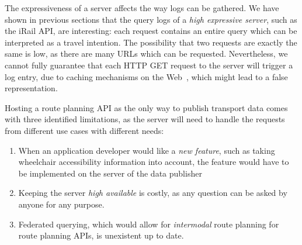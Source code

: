 \documentclass{sig-alternate}
\begin{document}




%

The expressiveness of a server affects the way logs can be gathered.
We have shown in previous sections that the query logs of a \emph{high expressive server}, such as the iRail API, are interesting: each request contains an entire query which can be interpreted as a travel intention.
The possibility that two requests are exactly the same is low, as there are many URLs which can be requested.
Nevertheless, we cannot fully guarantee that each HTTP GET request to the server will trigger a log entry, due to caching mechanisms on the Web~\cite{fielding}, which might lead to a false representation.

Hosting a route planning API as the only way to publish transport data comes with three identified limitations, as the server will need to handle the requests from different use cases with different needs:
\begin{enumerate}
  \item When an application developer would like a \emph{new feature}, such as taking wheelchair accessibility information into account, the feature would have to be implemented on the server of the data publisher
  \item Keeping the server \emph{high available} is costly, as any question can be asked by anyone for any purpose.
  \item Federated querying, which would allow for \emph{intermodal} route planning for route planning APIs, is unexistent up to date.
\end{enumerate}
\end{document}
